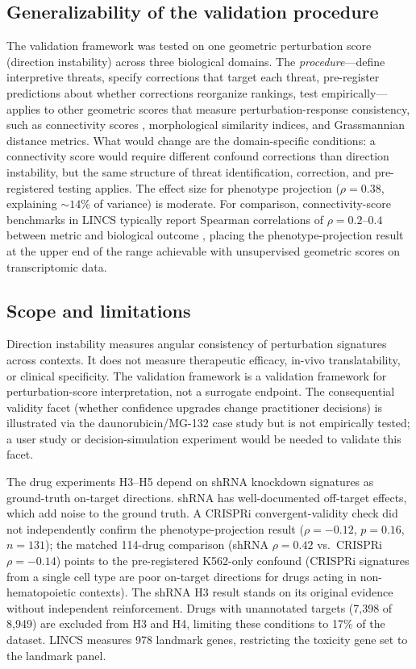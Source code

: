 \documentclass[11pt]{article}
\begin{document}
\subsection{Generalizability of the validation procedure}

The validation framework was tested on one geometric perturbation score
(direction instability) across three biological domains. The
\emph{procedure}---define interpretive threats, specify corrections
that target each threat, pre-register predictions about whether
corrections reorganize rankings, test empirically---applies to other
geometric scores that measure perturbation-response consistency, such as
connectivity scores \citep{subramanian2017next}, morphological similarity
indices, and Grassmannian distance metrics. What would change are the
domain-specific conditions: a connectivity score would require different
confound corrections than direction instability, but the same
structure of threat identification, correction, and pre-registered
testing applies. The effect size for phenotype projection ($\rho = 0.38$,
explaining ${\sim}14\%$ of variance) is moderate. For comparison,
connectivity-score benchmarks in LINCS typically report Spearman
correlations of $\rho = 0.2$--$0.4$ between metric and biological
outcome \citep{li2020comprehensive}, placing the phenotype-projection
result at the upper end of the range achievable with unsupervised
geometric scores on transcriptomic data.

\subsection{Scope and limitations}

Direction instability measures angular consistency of perturbation signatures
across contexts. It does not measure therapeutic efficacy, in-vivo
translatability, or clinical specificity. The validation framework is a
validation framework for perturbation-score interpretation, not a surrogate
endpoint. The consequential validity facet (whether confidence upgrades
change practitioner decisions) is illustrated via the daunorubicin/MG-132
case study but is not empirically tested; a user study or
decision-simulation experiment would be needed to validate this facet.

The drug experiments H3--H5 depend on shRNA knockdown signatures as
ground-truth on-target directions. shRNA has well-documented off-target
effects, which add noise to the ground truth. A CRISPRi
convergent-validity check did not
independently confirm the phenotype-projection result ($\rho = -0.12$,
$p = 0.16$, $n = 131$); the matched 114-drug comparison (shRNA
$\rho = 0.42$ vs.\ CRISPRi $\rho = -0.14$) points to the
pre-registered K562-only confound (CRISPRi signatures from a single
cell type are poor on-target directions for drugs acting in
non-hematopoietic contexts). The shRNA H3 result stands on its original evidence without
independent reinforcement. Drugs with unannotated targets
(7{,}398 of 8{,}949) are excluded from H3 and H4, limiting these conditions
to 17\% of the dataset. LINCS measures 978 landmark genes, restricting
the toxicity gene set to the landmark panel.
\end{document}
